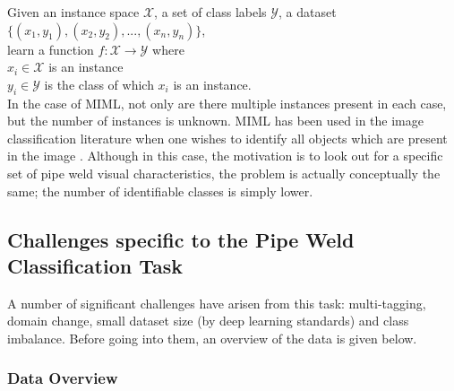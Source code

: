 \documentclass[a4paper,11pt]{article}
\begin{document}
\indent Given an instance space $\mathcal{X}$, a set of class labels $\mathcal{Y}$, a dataset $\{(x_{1},y_{1}),(x_{2},y_{2}), ..., (x_{n},y_{n})\}$,\\ 
\indent learn a function $f : \mathcal{X} \rightarrow \mathcal{Y}$ where\\  
\indent \indent $x_{i} \in \mathcal{X}$ is an instance \\   
\indent \indent $y_{	i} \in \mathcal{Y}$ is the class of which $x_{i}$ is an instance.\\

In the case of MIML, not only are there multiple instances present in each case, but the number of instances is unknown. MIML has been used in the image classification literature when one wishes to identify all objects which are present in the image \cite{MIML}. Although in this case, the motivation is to look out for a specific set of pipe weld visual characteristics, the problem is actually conceptually the same; the number of identifiable classes is simply lower. \\


\subsection{Challenges specific to the Pipe Weld Classification Task}

A number of significant challenges have arisen from this task: multi-tagging, domain change, small dataset size (by deep learning standards) and class imbalance. Before going into them, an overview of the data is given below. \\

\subsubsection{Data Overview}
\end{document}
